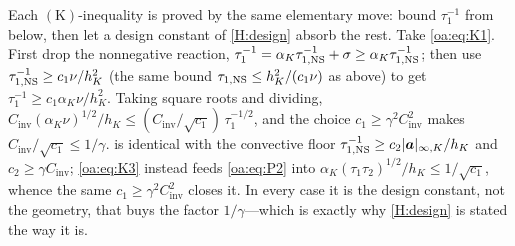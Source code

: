 \begin{pedagogy}
Each $(\mathrm{K})$-inequality is proved by the same elementary move: bound
$\tau_1^{-1}$ from below, then let a design constant of \cref{H:design} absorb the
rest. Take \cref{oa:eq:K1}. First drop the nonnegative reaction,
$\tau_1^{-1}=\alpha_K\tau_{1,\mathrm{NS}}^{-1}+\sigma\ge\alpha_K\tau_{1,\mathrm{NS}}^{-1}$; then use
$\tau_{1,\mathrm{NS}}^{-1}\ge c_1\nu/h_K^2$ (the same bound $\tau_{1,\mathrm{NS}}\le h_K^2/(c_1\nu)$ as above) to get
$\tau_1^{-1}\ge c_1\alpha_K\nu/h_K^2$. Taking square roots and dividing,
$C_{\mathrm{inv}}(\alpha_K\nu)^{1/2}/h_K\le(C_{\mathrm{inv}}/\sqrt{c_1})\,\tau_1^{-1/2}$,
and the choice $c_1\ge\gamma^2 C_{\mathrm{inv}}^2$ makes $C_{\mathrm{inv}}/\sqrt{c_1}\le1/\gamma$.
 is identical with the convective floor
$\tau_{1,\mathrm{NS}}^{-1}\ge c_2|\boldsymbol{a}|_{\infty,K}/h_K$ and $c_2\ge\gamma C_{\mathrm{inv}}$;
\cref{oa:eq:K3} instead feeds \cref{oa:eq:P2} into
$\alpha_K(\tau_1\tau_2)^{1/2}/h_K\le1/\sqrt{c_1}$, whence the same $c_1\ge\gamma^2 C_{\mathrm{inv}}^2$
closes it. In every case it is the design constant, not the geometry, that buys the
factor $1/\gamma$---which is exactly why \cref{H:design} is stated the way it is.
\end{pedagogy}


